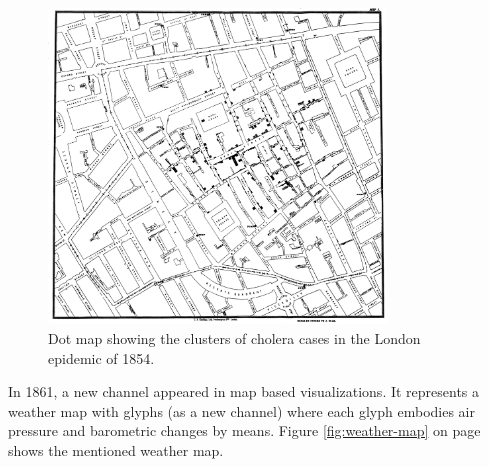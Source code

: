 \begin{figure}[h]
\centering
\includegraphics[width=0.8\textwidth,keepaspectratio]{images/history/cholera.jpg}
\caption[
    Dot map showing the clusters of cholera cases in the London epidemic of 1854., Urldate: 07.2016 \newline
\small\texttt{\url{https://upload.wikimedia.org/wikipedia/commons/2/27/Snow-cholera-map-1.jpg}}
]{Dot map showing the clusters of cholera cases in the London epidemic of 1854.}
\label{fig:cholera-map}
\end{figure}

In 1861, a new channel appeared in map based visualizations. It represents a weather map with glyphs (as a new channel) where each glyph embodies air pressure and barometric changes by means. Figure \ref{fig:weather-map} on page \pageref{fig:weather-map} shows the mentioned weather map.

